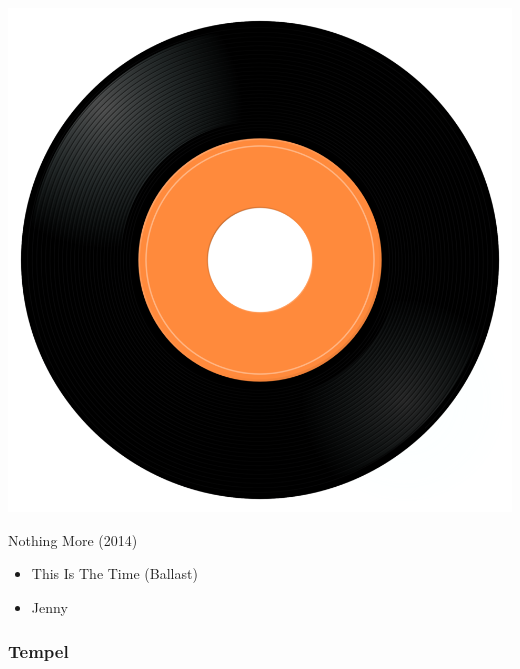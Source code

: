 \begin{minipage}[t]{0.25\textwidth}\vspace{0pt}
\captionsetup{type=figure}
\includegraphics[width=\textwidth]{Images/cover.png}
\caption*{Nothing More (2014)}
\end{minipage}
\begin{minipage}[t]{0.25\textwidth}\vspace{0pt}
\begin{itemize}[nosep,leftmargin=1em,labelwidth=*,align=left]
	\setlength{\itemsep}{0pt}
	\item This Is The Time (Ballast)
	\item Jenny	
\end{itemize}
\end{minipage}

\subsubsection{Tempel}

